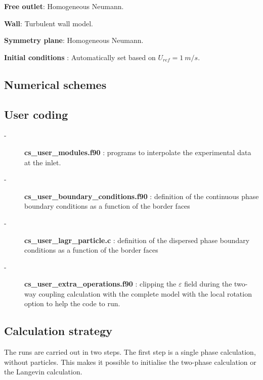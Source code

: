 \begin{itemize}
\begin{description}
\begin{description}
         \end{description}

   \item[-]\textbf{Free outlet}: Homogeneous Neumann.
   \item[-]\textbf{Wall}: Turbulent wall model.
   \item[-]\textbf{Symmetry plane}: Homogeneous Neumann. 

   \item[-]\textbf{Initial conditions} : Automatically set based on $U_{ref}=1~m/s$.
\end{description}

\end{itemize}

\subsection{Numerical schemes}


\subsection{User coding}

\begin{description}

   \item[-] \textbf{cs\_user\_modules.f90} : programs to interpolate the experimental data at the inlet.
   
   \item[-] \textbf{cs\_user\_boundary\_conditions.f90} : definition of the continuous phase boundary conditions as a function of the border faces
   
   \item[-] \textbf{cs\_user\_lagr\_particle.c} : definition of the dispersed phase boundary conditions as a function of the border faces
   
   \item[-] \textbf{cs\_user\_extra\_operations.f90} : clipping the $\varepsilon$ field during the two-way coupling calculation with the complete model with the local rotation option to help the code to run.

\end{description}

\subsection{Calculation strategy}

The runs are carried out in two steps. The first step is a single phase calculation, without particles. This makes it possible to initialise the two-phase calculation or the Langevin calculation.\\ 

